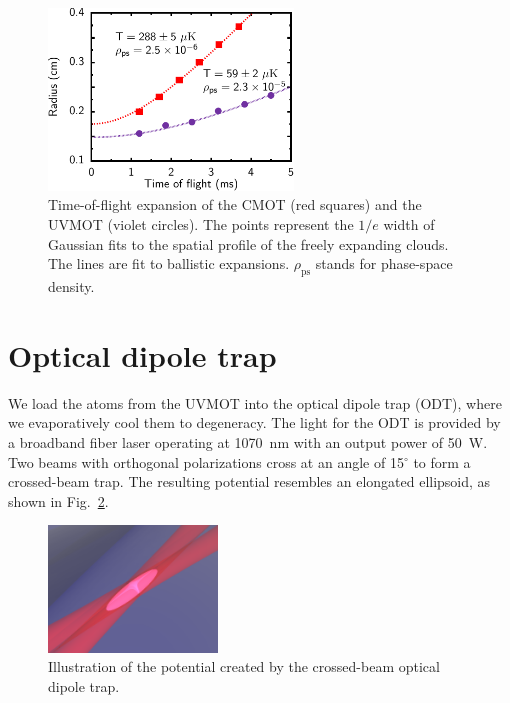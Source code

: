 \begin{figure}
\hspace{0.16\textwidth}
\includegraphics[width=0.58\textwidth]{../masters-figures/323mot/tofexpansion/tofeps.pdf}
\caption[CMOT and UVMOT time-of-flight expansion]{\small Time-of-flight
expansion of the CMOT (red squares) and the UVMOT  (violet circles).  The
points represent the $1/e$ width of Gaussian fits to the spatial profile of the
freely expanding clouds.  The lines are fit to ballistic expansions.
$\rho_{\mathrm{ps}}$ stands for phase-space density.}
\label{fig:uvtexpUV} \end{figure} 



\section{Optical dipole trap}

We load the atoms from the UVMOT into the optical dipole trap (ODT), where we
evaporatively cool them to degeneracy. The light for the ODT is provided by a
broadband fiber laser operating at 1070~nm with an output power of 50~W.  Two
beams with orthogonal polarizations cross at an angle of 15$^{\circ}$ to form a
crossed-beam trap. The resulting potential resembles an elongated ellipsoid, as
shown in Fig.~\ref{fig:odt-cartoon}. 
\begin{figure} \centering
\includegraphics[width=0.4\textwidth]{../masters-figures/odt/15deg-crossbeam.png}
\caption[Optical dipole trap]{\small Illustration of the potential created by
the crossed-beam optical dipole trap.  } \label{fig:odt-cartoon}
\end{figure}

